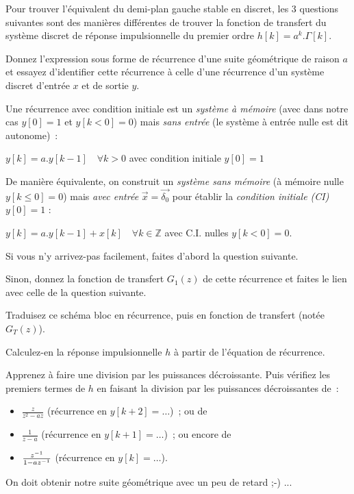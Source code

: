 Pour trouver l'équivalent du demi-plan gauche stable en discret, les 3 questions suivantes sont des
manières différentes de trouver la fonction de transfert du système
discret de réponse impulsionnelle du premier ordre $h[k]=a^k.\Gamma[k]$.



Donnez l'expression sous forme de récurrence d'une suite géométrique
de raison $a$ et essayez d'identifier cette récurrence à celle d'une
récurrence d'un système discret d'entrée $x$ et de sortie $y$.


\begin{remarque}
  Une récurrence avec condition initiale est un \emph{système à
    mémoire} (avec dans notre cas $y[0]=1$ et $y[k<0]=0$) mais
\emph{sans entrée} (le système à entrée nulle est dit autonome)~:
 
 $y[k]=a.y[k-1] \quad \forall k>0$ avec condition initiale $y[0]=1$

 De manière équivalente, on construit un \emph{système sans mémoire}
 (à mémoire nulle $y[k\leq 0]=0$) mais \emph{avec entrée}
 $\vec{x}=\vec{\delta_0}$ pour établir la \emph{condition initiale
   (CI)} $y[0]=1$ :
  
 $y[k]=a.y[k-1] + x[k] \quad \forall k\in\mathbb{Z}$ avec C.I. nulles
 $y[k<0]=0$.
 
 
\end{remarque}


Si vous n'y arrivez-pas facilement, faites d'abord la question suivante.

Sinon, donnez la fonction de transfert $G_1(z)$ de cette récurrence et
faites le lien avec celle de la question suivante.





Traduisez ce schéma bloc en récurrence, puis en fonction de transfert (notée $G_T(z)$).

Calculez-en la réponse impulsionnelle $h$ à partir de l'équation de récurrence.


\begin{remarque}
  
  Apprenez à faire une division par les puissances décroissante. Puis
  vérifiez les premiers termes de $h$ en faisant la division par les
  puissances décroissantes de~:
\begin{itemize}
\item $\frac{z}{z^2-az}$ (récurrence en $y[k+2]=\dots$)~; ou de
\item $\frac{1}{z-a}$ (récurrence en $y[k+1]=\dots$)~; ou encore de
\item $\frac{z^{-1}}{1-az^{-1}}$ (récurrence en $y[k]=\dots$).
\end{itemize}
\end{remarque}
On doit obtenir notre suite géométrique avec un peu de retard ;-) ...


